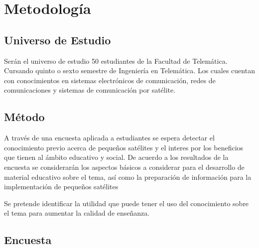 
\chapter{Metodolog\'{i}a} %



\section{Universo de Estudio}
Ser\'{a}n el universo de estudio 50 estudiantes de la Facultad de Telem\'{a}tica.
Cursando quinto o sexto semestre de Ingenier\'{i}a en Telem\'{a}tica. Los cuales cuentan con conocimientos en sistemas electr\'{o}nicos de comunicaci\'{o}n, redes de comunicaciones y sistemas de comunicaci\'{o}n por sat\'{e}lite.


\section{M\'{e}todo}

A  través de una encuesta aplicada a estudiantes se espera detectar el conocimiento previo acerca de pequeños satélites y el interes por los beneficios que tienen al ámbito educativo y social. De acuerdo a los resultados de la encuesta se considerarán los aspectos básicos a considerar para el desarrollo de material educativo sobre el tema, así como la preparación de información para la implementación de pequeños satélites

Se pretende identificar la utilidad que puede tener el uso del conocimiento sobre el tema para aumentar la calidad de enseñanza.
\section{Encuesta}




